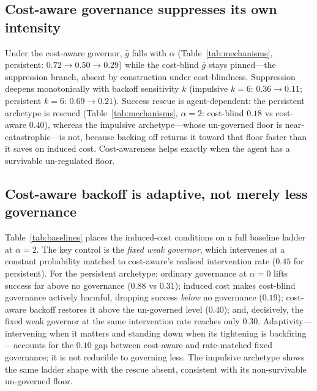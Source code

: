 \documentclass[11pt]{article}
\begin{document}
\subsection{Cost-aware governance suppresses its own intensity}
\label{sec:suppression}

Under the cost-aware governor, $\bar g$ falls with $\alpha$ (Table~\ref{tab:mechanisms},
persistent: $0.72\to0.50\to0.29$) while the cost-blind $\bar g$ stays pinned---the
suppression branch, absent by construction under cost-blindness. Suppression
deepens monotonically with backoff sensitivity $k$ (impulsive $k{=}6$:
$0.36\to0.11$; persistent $k{=}6$: $0.69\to0.21$). Success rescue is
agent-dependent: the persistent archetype is rescued (Table~\ref{tab:mechanisms},
$\alpha{=}2$: cost-blind $0.18$ vs cost-aware $0.40$), whereas the impulsive
archetype---whose un-governed floor is near-catastrophic---is not, because
backing off returns it toward that floor faster than it saves on induced cost.
Cost-awareness helps exactly when the agent has a survivable un-regulated floor.

\subsection{Cost-aware backoff is adaptive, not merely less governance}
\label{sec:baselines}

Table~\ref{tab:baselines} places the induced-cost conditions on a full baseline
ladder at $\alpha=2$. The key control is the \emph{fixed weak governor}, which
intervenes at a constant probability matched to cost-aware's realised
intervention rate ($0.45$ for persistent). For the persistent archetype:
ordinary governance at $\alpha=0$ lifts success far above no governance
($0.88$ vs $0.31$); induced cost makes cost-blind governance actively harmful,
dropping success \emph{below} no governance ($0.19$); cost-aware backoff
restores it above the un-governed level ($0.40$); and, decisively, the fixed
weak governor at the same intervention rate reaches only $0.30$. Adaptivity---%
intervening when it matters and standing down when its tightening is
backfiring---accounts for the $0.10$ gap between cost-aware and rate-matched
fixed governance; it is not reducible to governing less. The impulsive
archetype shows the same ladder shape with the rescue absent, consistent with
its non-survivable un-governed floor.
\end{document}
